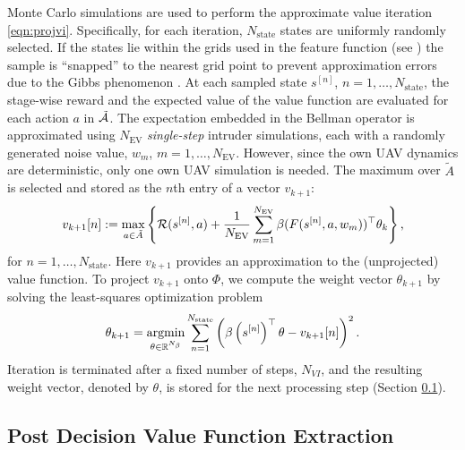 Monte Carlo simulations are used to perform the approximate value iteration \eqref{eqn:projvi}. Specifically, for each iteration, $N_\text{state}$ states are uniformly randomly selected. If the states lie within the grids used in the feature function (see ) the sample is ``snapped'' to the nearest grid point to prevent approximation errors due to the Gibbs phenomenon \cite{JF-FBR:91}. At each sampled state $s^{[n]}$, $n=1,\ldots, N_\text{state}$, the stage-wise reward and the expected value of the value function are evaluated for each action $a$ in $\tilde{\mathcal{A}}$. The expectation embedded in the Bellman operator is approximated using $N_{\text{EV}}$ \emph{single-step} intruder simulations, each with a randomly generated noise value, $w_m$, $m=1,\ldots, N_{\text{EV}}$. However, since the own UAV dynamics are deterministic, only one own UAV simulation is needed. The maximum over $\tilde{A}$ is selected and stored as the $n$th entry of a vector $v_{k+1}$:
\begin{equation}
    v_{k+1}[n] := \max_{a \in \tilde{A}} \left\{\mathcal{R}(s^{[n]},a) + \frac{1}{N_{\text{EV}}}\sum_{m=1}^{N_{\text{EV}}} \beta(F(s^{[n]}, a, w_m))^\top \theta_k \right\} \text{,}
\end{equation}
for $n=1,\ldots, N_\text{state}$. Here $v_{k+1}$ provides an approximation to the (unprojected) value function. To project $v_{k+1}$ onto $\Phi$, we compute the weight vector $\theta_{k+1}$ by solving the least-squares optimization problem
\begin{equation} \label{eq:leastsq}
    \theta_{k+1} = \underset{\theta\in \reals^{N_\beta}}{\argmin} \sum_{n=1}^{N_\text{state}} \left( \beta\left(s^{[n]}\right)^\top \theta - v_{k+1}[n] \right) ^2 \text{.}
\end{equation}
Iteration is terminated after a fixed number of steps, $N_{VI}$, and the resulting weight vector, denoted by $\theta$, is stored for the next processing step (Section \ref{sec:extract}).

\subsection{Post Decision Value Function Extraction} \label{sec:extract}

